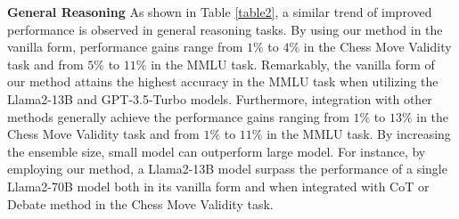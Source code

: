 \textbf{General Reasoning} As shown in Table \ref{table2}, a similar trend of improved performance is observed in general reasoning tasks. By using our method in the vanilla form, performance gains range from $1\%$ to $4\%$ in the Chess Move Validity task and from $5\%$ to $11\%$ in the MMLU task. Remarkably, the vanilla form of our method attains the highest accuracy in the MMLU task when utilizing the Llama2-13B and GPT-3.5-Turbo models. Furthermore, integration with other methods generally achieve the performance gains ranging from $1\%$ to $13\%$ in the Chess Move Validity task and from $1\%$ to $11\%$ in the MMLU task. By increasing the ensemble size, small model can outperform large model. For instance, by employing our method, a Llama2-13B model surpass the performance of a single Llama2-70B model both in its vanilla form and when integrated with CoT or Debate method in the Chess Move Validity task.



